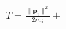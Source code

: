 \documentclass[preview]{standalone}
\begin{document}
\begin{align*}
T = \frac{\|\mathbf p_i\|^2}{2m_i} +
\end{align*}
\end{document}
